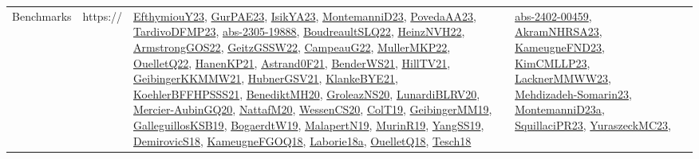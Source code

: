 {\begin{longtable}{lp{3cm}>{\raggedright}p{6cm}>{\raggedright}p{6cm}p{8cm}}
Benchmarks & https:// & \href{papers/EfthymiouY23.pdf}{EfthymiouY23}\cite{EfthymiouY23}, \href{articles/GurPAE23.pdf}{GurPAE23}\cite{GurPAE23}, \href{articles/IsikYA23.pdf}{IsikYA23}\cite{IsikYA23}, \href{articles/MontemanniD23.pdf}{MontemanniD23}\cite{MontemanniD23}, \href{papers/PovedaAA23.pdf}{PovedaAA23}\cite{PovedaAA23}, \href{papers/TardivoDFMP23.pdf}{TardivoDFMP23}\cite{TardivoDFMP23}, \href{articles/abs-2305-19888.pdf}{abs-2305-19888}\cite{abs-2305-19888}, \href{papers/BoudreaultSLQ22.pdf}{BoudreaultSLQ22}\cite{BoudreaultSLQ22}, \href{articles/HeinzNVH22.pdf}{HeinzNVH22}\cite{HeinzNVH22}, \href{papers/ArmstrongGOS22.pdf}{ArmstrongGOS22}\cite{ArmstrongGOS22}, \href{papers/GeitzGSSW22.pdf}{GeitzGSSW22}\cite{GeitzGSSW22}, \href{articles/CampeauG22.pdf}{CampeauG22}\cite{CampeauG22}, \href{articles/MullerMKP22.pdf}{MullerMKP22}\cite{MullerMKP22}, \href{papers/OuelletQ22.pdf}{OuelletQ22}\cite{OuelletQ22}, \href{papers/HanenKP21.pdf}{HanenKP21}\cite{HanenKP21}, \href{papers/Astrand0F21.pdf}{Astrand0F21}\cite{Astrand0F21}, \href{papers/BenderWS21.pdf}{BenderWS21}\cite{BenderWS21}, \href{papers/HillTV21.pdf}{HillTV21}\cite{HillTV21}, \href{papers/GeibingerKKMMW21.pdf}{GeibingerKKMMW21}\cite{GeibingerKKMMW21}, \href{articles/HubnerGSV21.pdf}{HubnerGSV21}\cite{HubnerGSV21}, \href{papers/KlankeBYE21.pdf}{KlankeBYE21}\cite{KlankeBYE21}, \href{articles/KoehlerBFFHPSSS21.pdf}{KoehlerBFFHPSSS21}\cite{KoehlerBFFHPSSS21}, \href{articles/BenediktMH20.pdf}{BenediktMH20}\cite{BenediktMH20}, \href{papers/GroleazNS20.pdf}{GroleazNS20}\cite{GroleazNS20}, \href{articles/LunardiBLRV20.pdf}{LunardiBLRV20}\cite{LunardiBLRV20}, \href{papers/Mercier-AubinGQ20.pdf}{Mercier-AubinGQ20}\cite{Mercier-AubinGQ20}, \href{papers/NattafM20.pdf}{NattafM20}\cite{NattafM20}, \href{papers/WessenCS20.pdf}{WessenCS20}\cite{WessenCS20}, \href{papers/ColT19.pdf}{ColT19}\cite{ColT19}, \href{papers/GeibingerMM19.pdf}{GeibingerMM19}\cite{GeibingerMM19}, \href{papers/GalleguillosKSB19.pdf}{GalleguillosKSB19}\cite{GalleguillosKSB19}, \href{papers/BogaerdtW19.pdf}{BogaerdtW19}\cite{BogaerdtW19}, \href{papers/MalapertN19.pdf}{MalapertN19}\cite{MalapertN19}, \href{papers/MurinR19.pdf}{MurinR19}\cite{MurinR19}, \href{papers/YangSS19.pdf}{YangSS19}\cite{YangSS19}, \href{papers/DemirovicS18.pdf}{DemirovicS18}\cite{DemirovicS18}, \href{papers/KameugneFGOQ18.pdf}{KameugneFGOQ18}\cite{KameugneFGOQ18}, \href{papers/Laborie18a.pdf}{Laborie18a}\cite{Laborie18a}, \href{papers/OuelletQ18.pdf}{OuelletQ18}\cite{OuelletQ18}, \href{papers/Tesch18.pdf}{Tesch18}\cite{Tesch18} & \href{articles/abs-2402-00459.pdf}{abs-2402-00459}\cite{abs-2402-00459}, \href{articles/AkramNHRSA23.pdf}{AkramNHRSA23}\cite{AkramNHRSA23}, \href{papers/KameugneFND23.pdf}{KameugneFND23}\cite{KameugneFND23}, \href{papers/KimCMLLP23.pdf}{KimCMLLP23}\cite{KimCMLLP23}, \href{articles/LacknerMMWW23.pdf}{LacknerMMWW23}\cite{LacknerMMWW23}, \href{papers/Mehdizadeh-Somarin23.pdf}{Mehdizadeh-Somarin23}\cite{Mehdizadeh-Somarin23}, \href{articles/MontemanniD23a.pdf}{MontemanniD23a}\cite{MontemanniD23a}, \href{papers/SquillaciPR23.pdf}{SquillaciPR23}\cite{SquillaciPR23}, \href{papers/YuraszeckMC23.pdf}{YuraszeckMC23}\cite{YuraszeckMC23}, 
\end{longtable}}
